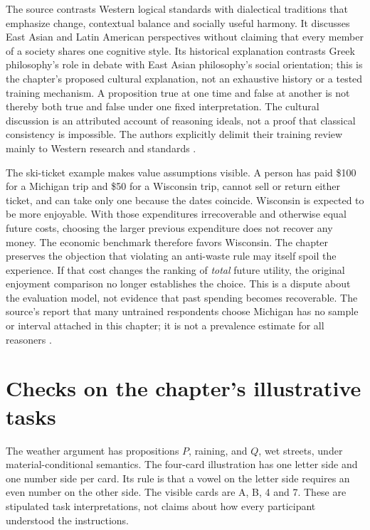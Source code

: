 The source contrasts Western logical standards with dialectical traditions
that emphasize change, contextual balance and socially useful harmony. It
discusses East Asian and Latin American perspectives without claiming that
every member of a society shares one cognitive style. Its historical
explanation contrasts Greek philosophy's role in debate with East Asian
philosophy's social orientation; this is the chapter's proposed cultural
explanation, not an exhaustive history or a tested training mechanism.
A proposition true
at one time and false at another is not thereby both true and false under
one fixed interpretation. The cultural discussion is an attributed account
of reasoning ideals, not a proof that classical consistency is impossible.
The authors explicitly delimit their training review mainly to Western
research and standards \cite[pp.~801--802]{DeOliveiraNisbett2021Improve}.

The ski-ticket example makes value assumptions visible. A person has paid
\$100 for a Michigan trip and \$50 for a Wisconsin trip, cannot sell or
return either ticket, and can take only one because the dates coincide.
Wisconsin is expected to be more enjoyable. With those expenditures
irrecoverable and otherwise equal future costs, choosing the larger
previous expenditure does not recover any money. The economic benchmark
therefore favors Wisconsin. The chapter preserves the objection that
violating an anti-waste rule may itself spoil the experience. If that cost
changes the ranking of \emph{total} future utility, the original enjoyment
comparison no longer establishes the choice. This is a dispute about the
evaluation model, not evidence that past spending becomes recoverable.
The source's report that many untrained respondents choose Michigan has
no sample or interval attached in this chapter; it is not a prevalence
estimate for all reasoners \cite[p.~802]{DeOliveiraNisbett2021Improve}.

\section{Checks on the chapter's illustrative tasks}
\label{sec:p19-r153-source-checks}

The weather argument has propositions \(P\), raining, and \(Q\), wet
streets, under material-conditional semantics. The four-card illustration
has one letter side and one number side per card. Its rule is that a vowel
on the letter side requires an even number on the other side. The visible
cards are A, B, 4 and 7. These are stipulated task interpretations, not
claims about how every participant understood the instructions.

